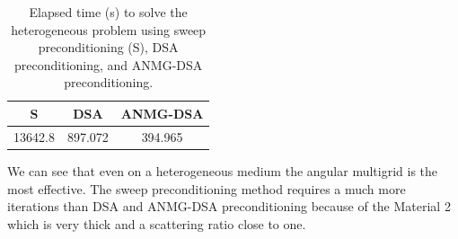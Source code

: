 \begin{table}[H]
  \begin{center}
    \caption{Elapsed time (s) to solve the heterogeneous problem using sweep
    preconditioning (S), DSA preconditioning, and ANMG-DSA preconditioning.}
    \begin{tabular}{|c|c|c|}
      \hline
      S & DSA & ANMG-DSA \\
      \hline
      13642.8 & 897.072& 394.965 \\
      \hline
    \end{tabular}
    \label{table_time_heter}
  \end{center}
\end{table}
We can see that even on a heterogeneous medium the angular multigrid is the
most effective. The sweep preconditioning method requires a much more
iterations than DSA and ANMG-DSA preconditioning because of the Material 2
which is very thick and a scattering ratio close to one.
